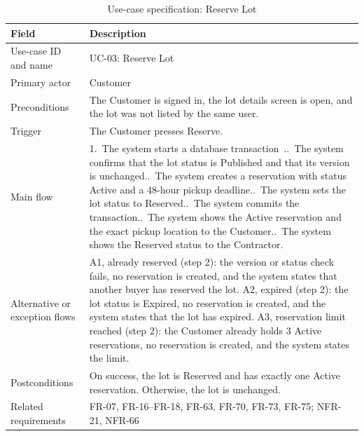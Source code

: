 \begin{table}[H]
\centering
\caption{Use-case specification: Reserve Lot}
\label{tab:uc-reserve-lot}
\footnotesize
\begin{tabularx}{\textwidth}{@{}p{}X@{}}
\toprule
\textbf{Field} & \textbf{Description} \\
\midrule
Use-case ID and name & UC-03: Reserve Lot \\
Primary actor & Customer \\
Preconditions & The Customer is signed in, the lot details screen is open, and the lot was not listed by the same user. \\
Trigger & The Customer presses Reserve. \\
Main flow & 1.~The system starts a database transaction~\citep{postgresqlisolation}.\newline
2.~The system confirms that the lot status is Published and that its version is unchanged.\newline
3.~The system creates a reservation with status Active and a 48-hour pickup deadline.\newline
4.~The system sets the lot status to Reserved.\newline
5.~The system commits the transaction.\newline
6.~The system shows the Active reservation and the exact pickup location to the Customer.\newline
7.~The system shows the Reserved status to the Contractor. \\
Alternative or exception flows & A1, already reserved (step 2): the version or status check fails, no reservation is created, and the system states that another buyer has reserved the lot.\newline
A2, expired (step 2): the lot status is Expired, no reservation is created, and the system states that the lot has expired.\newline
A3, reservation limit reached (step 2): the Customer already holds 3 Active reservations, no reservation is created, and the system states the limit. \\
Postconditions & On success, the lot is Reserved and has exactly one Active reservation. Otherwise, the lot is unchanged. \\
Related requirements & FR-07, FR-16--FR-18, FR-63, FR-70, FR-73, FR-75; NFR-21, NFR-66 \\
\bottomrule
\end{tabularx}
\end{table}

